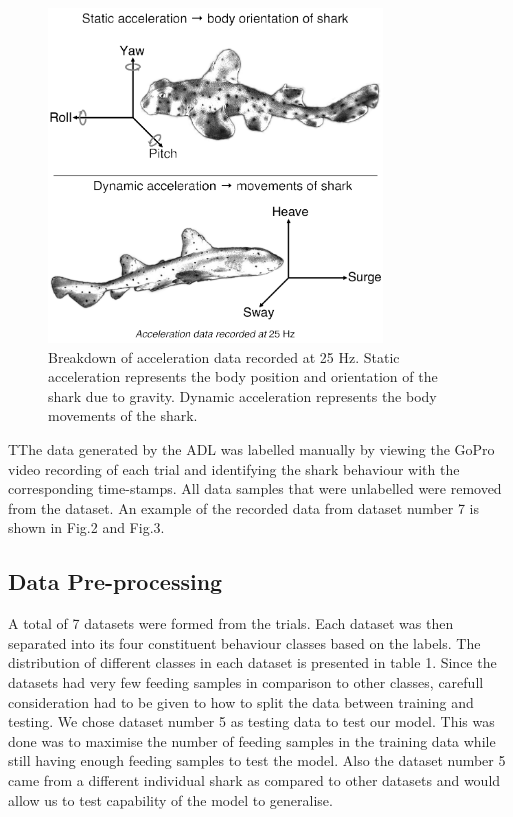 \documentclass[conference]{IEEEtran}
\begin{document}
\begin{figure}[h]
	\centering
	\includegraphics[width=3.49in]{accel.pdf}
	\caption{Breakdown of acceleration data recorded at 25 Hz. Static acceleration represents the body position and orientation of the shark due to gravity. Dynamic acceleration represents the body movements of the shark.}
	\label{accel}
\end{figure}

TThe data generated by the ADL was labelled manually by viewing the GoPro video recording of each trial and identifying the shark behaviour with the corresponding time-stamps. All data samples that were unlabelled were removed from the dataset. An example of the recorded data from dataset number 7 is shown in Fig.2 and Fig.3.


\subsection{Data Pre-processing}
A total of 7 datasets were formed from the trials. Each dataset was then separated into its four constituent behaviour classes based on the labels. The distribution of different classes in each dataset is presented in table 1. Since the datasets had very few feeding samples in comparison to other classes, carefull consideration had to be given to how to split the data between training and testing. We chose dataset number 5 as testing data to test our model. This was done was to maximise the number of feeding samples in the training data while still having enough feeding samples to test the model. Also the dataset number 5 came from a different individual shark as compared to other datasets and would allow us to test capability of the model to generalise.
\end{document}
